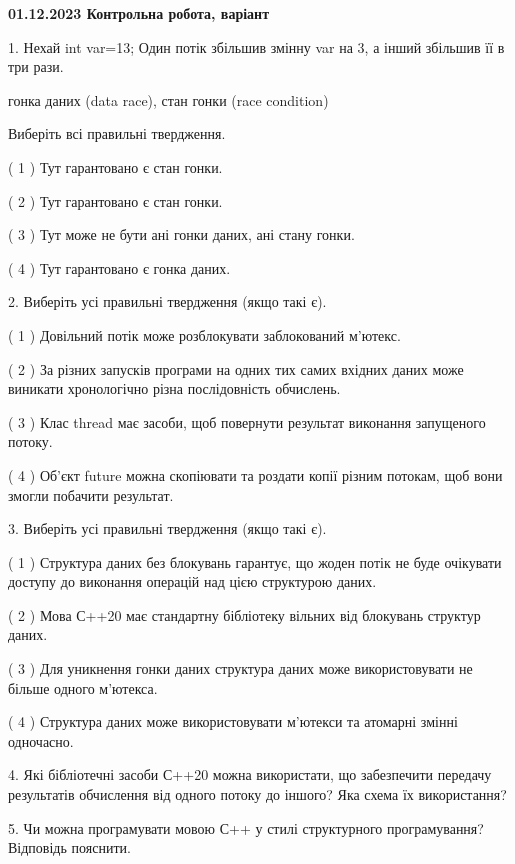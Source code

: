 \documentclass[12pt, ukrainian]{article}
\begin{document}
\vspace{4mm}
\newpage
\begin {large}

\textbf{01.12.2023 Контрольна робота, варіант  }\par


{
1. Нехай int var=13; Один потік збільшив змінну var на 3, а інший збільшив її в три рази.

гонка даних (data race), стан гонки (race condition)

Виберіть всі правильні твердження.\par
\vspace{2mm}
( 1 ) Тут гарантовано є стан гонки.%

( 2 ) Тут гарантовано є стан гонки.%

( 3 ) Тут може не бути ані гонки даних, ані стану гонки.%

( 4 ) Тут гарантовано є гонка даних.%


\vspace{5mm}
2. Виберіть усі правильні твердження (якщо такі є).\par
\vspace{2mm}

( 1 ) Довільний потік може розблокувати заблокований м’ютекс.%

( 2 ) За різних запусків програми на одних тих самих вхідних даних може виникати хронологічно різна послідовність обчислень.%

( 3 ) Клас thread має засоби, щоб повернути результат виконання запущеного потоку.%

( 4 ) Об’єкт future можна скопіювати та роздати копії різним потокам, щоб вони змогли побачити результат.%


\vspace{5mm}
3. Виберіть усі правильні твердження (якщо такі є).\par
\vspace{2mm}

( 1 ) Структура даних без блокувань гарантує, що жоден потік не буде очікувати доступу до виконання операцій над цією структурою даних.%

( 2 ) Мова С++20 має стандартну бібліотеку вільних від блокувань структур даних.%

( 3 ) Для уникнення гонки даних структура даних може використовувати не більше одного м’ютекса.%

( 4 ) Структура даних може використовувати м’ютекси та атомарні змінні одночасно.%


\vspace{5mm}
4. Які бібліотечні засоби С++20 можна використати, що забезпечити передачу результатів обчислення від одного потоку до іншого? Яка схема їх використання?



\vspace{5mm}
5. Чи можна програмувати мовою С++ у стилі структурного програмування? Відповідь пояснити.
}
\end {large}
\end{document}

